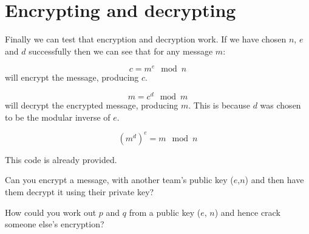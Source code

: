 \documentclass[a4paper]{article}
\begin{document}
\section*{Encrypting and decrypting}
Finally we can test that encryption and decryption work. If we
  have chosen $n$, $e$ and $d$ successfully then we can see that for any
  message $m$:

\[ c = m^e \mod n \] will encrypt the message, producing $c$.

\[ m = c^d \mod m \] will decrypt the encrypted message, producing
$m$. This is because $d$ was chosen to be the modular inverse of $e$.

\[ (m^d)^e = m \mod n\]

This code is already provided.

Can you encrypt a message, with another team's public key ($e$,$n$)
and then have them decrypt it using their private key?

How could you work out $p$ and $q$ from a public key ($e$, $n$) and hence crack someone else's encryption?
\end{document}
